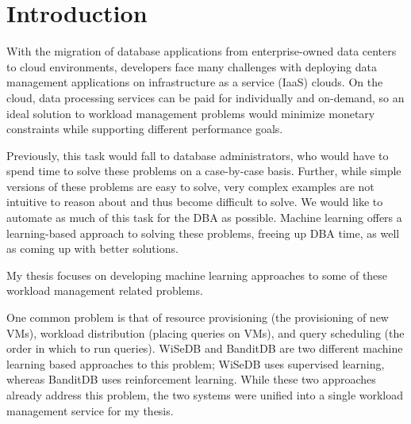 \documentclass{brandiss}
\numberwithin{section}{chapter}
\numberwithin{figure}{chapter}
\theoremstyle{definition}
\theoremstyle{plain}
\theoremstyle{remark}
\begin{document}
\frontmatter

\makedisstitle




\tableofcontents %

\listoffigures %



\mainmatter

\chapter{Introduction}

With the migration of database applications from enterprise-owned data centers to cloud environments, developers face many challenges with deploying data management applications on infrastructure as a service (IaaS) clouds. On the cloud, data processing services can be paid for individually and on-demand, so an ideal solution to workload management problems would minimize monetary constraints while supporting different performance goals.

Previously, this task would fall to database administrators, who would have to spend time to solve these problems on a case-by-case basis. Further, while simple versions of these problems are easy to solve, very complex examples are not intuitive to reason about and thus become difficult to solve. We would like to automate as much of this task for the DBA as possible. Machine learning offers a learning-based approach to solving these problems, freeing up DBA time, as well as coming up with better solutions. 

My thesis focuses on developing machine learning approaches to some of these workload management related problems.

One common problem is that of resource provisioning (the provisioning of new VMs), workload distribution (placing queries on VMs), and query scheduling (the order in which to run queries). WiSeDB \cite{wisedb-long} \cite{wisedb-short} and BanditDB \cite{banditdb} are two different machine learning based approaches to this problem; WiSeDB uses supervised learning, whereas BanditDB uses reinforcement learning. While these two approaches already address this problem, the two systems were unified into a single workload management service for my thesis. 
\end{document}

